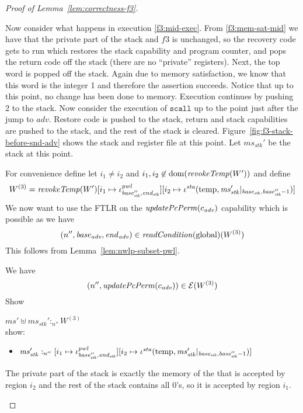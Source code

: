 \documentclass[a4paper]{article}
\newcommand{\update}[2]{[#1 \mapsto #2]}
\DeclareMathOperator{\dom}{dom}
\newcommand{\var}[1]{\mathit{#1}}
\newcommand{\hs}{\var{ms}}
\newcommand{\ms}{\hs}
\newcommand{\start}{\var{base}}
\newcommand{\addrend}{\var{end}}
\newcommand{\heap}{\var{mem}}
\newcommand{\adv}{\var{adv}}
\newcommand{\stk}{\var{stk}}
\newcommand{\pwl}{\var{pwl}}
\newcommand{\sta}{\var{sta}}
\newcommand{\plainfun}[2]{
  \ifthenelse{\equal{#2}{}}
  {\mathit{#1}}
  {\mathit{#1}(#2)}
}
\newcommand{\updatePcPerm}[1]{\plainfun{updatePcPerm}{#1}}
\newcommand{\readCond}[1]{\plainfun{readCondition}{#1}}
\newcommand{\revokeTemp}[1]{\plainfun{revokeTemp}{#1}}
\newcommand{\heapSat}[3][\heap]{#1 :_{#2} #3}
\newcommand{\memSat}[3][n]{\heapSat[#2]{#1}{#3}}
\newcommand{\asmType}{\plaindom{AsmType}}
\newcommand{\plaindom}[1]{\mathrm{#1}}
\newcommand{\intr}[2]{\mathcal{#1}}
\newcommand{\exprintr}[1]{\intr{E}{#1}}
\newcommand{\stder}{\exprintr{\asmType}}
\newcommand{\npair}[2][n]{\left(#1,#2 \right)}
\newcommand{\plainperm}[1]{\mathrm{#1}}
\newcommand{\glob}{\plainperm{global}}
\newcommand{\plainview}[1]{\mathrm{#1}}
\newcommand{\temp}{\plainview{temp}}
\begin{document}
\begin{proof}[Proof of Lemma~\ref{lem:correctness-f3}]
\begin{enumproof}[start=3]
\begin{enumproof}[start=3]
      Now consider what happens in execution \ref{f3:mid-exec}. From \ref{f3:mem-sat-mid} we have that the private part of the stack and $f3$ is unchanged, so the recovery code gets to run which restores the stack capability and program counter, and pops the return code off the stack (there are no ``private'' registers). Next, the top word is popped off the stack. Again due to memory satisfaction, we know that this word is the integer 1 and therefore the assertion succeeds. Notice that up to this point, no change has been done to memory. Execution continues by pushing 2 to the stack. Now consider the execution of $\mathtt{scall}$ up to the point just after the jump to $\adv$. Restore code is pushed to the stack, return and stack capabilities are pushed to the stack, and the rest of the stack is cleared. Figure~\ref{fig:f3-stack-before-snd-adv} shows the stack and register file at this point. Let $\ms_\stk'$ be the stack at this point.

      For convenience define let $i_1 \neq i_2$ and $i_1,i_2 \not\in \dom(\revokeTemp{W'})$ and define
      \[
        W^{(3)} = \revokeTemp{W'}\update{i_1}{\iota^\pwl_{\base_\stk'',\addrend_\stk}}\update{i_2}{\iota^\sta (\temp,\ms_\stk' |_{\start_\stk,\base_\stk''-1})}
      \]
      We now want to use the FTLR on the $\updatePcPerm{c_\adv}$ capability which is possible as we have 
      \[
        \npair[n'']{\start_\adv,\addrend_\adv} \in \readCond{}(\glob)(W^{(3)})
      \]
      This follows from Lemma~\ref{lem:nwlp-subset-pwl}.

      We have 
      \[
        \npair[n'']{\updatePcPerm{c_\adv}} \in \stder(W^{(3)})
      \]
      Show
      \begin{enumproof}[resume]
      \item $\memSat[n'']{\ms' \uplus \ms_\stk'}{W^{(3)}}$ \\
        show:
        \begin{itemize}
        \item $\memSat[n'']{\ms_\stk'}{[i_1 \mapsto \iota^\pwl_{\base_\stk'',\addrend_\stk}][i_2\mapsto \iota^\sta (\temp,\ms_\stk' |_{\start_\stk,\base_\stk''-1})]}$ 
        \end{itemize}
        The private part of the stack is exactly the memory of the that is accepted by region $i_2$ and the rest of the stack contains all 0's, so it is accepted by region $i_1$.


\end{enumproof}
\end{enumproof}
\end{enumproof}
\end{proof}
\end{document}
